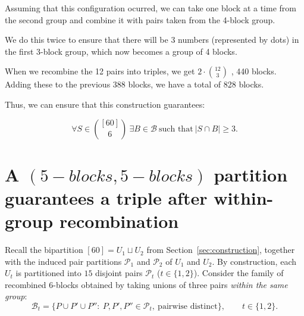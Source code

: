 \documentclass[11pt]{article}
\begin{document}

Assuming that this configuration ocurred, we can take one block at a time from the second group and combine it with pairs taken from the 4-block group.

We do this twice to ensure that there will be 3 numbers (represented by dots) in the first 3-block group, which now becomes a group of 4 blocks.

When we recombine the 12 pairs into triples, we get 
$2 \cdot \binom{12}{3}$ , 440 blocks. Adding these to the previous 388 blocks, we have a total of 828 blocks.

Thus, we can ensure that this construction guarantees:

\begin{equation}\label{eq:triple}
\forall S\in \binom{[60]}{6}\ \exists B\in\mathcal{B}\ \text{such that}\ |S\cap B|\ge 3.
\end{equation}

\section{A $(5-blocks,5-blocks)$ partition guarantees a triple after within-group recombination}
\label{sec:55-guarantee}

Recall the bipartition $[60]=U_1\sqcup U_2$ from Section~\ref{sec:construction}, together with the induced
pair partitions $\mathcal{P}_1$ and $\mathcal{P}_2$ of $U_1$ and $U_2$.
By construction, each $U_t$ is partitioned into $15$ disjoint pairs $\mathcal{P}_t$ ($t\in\{1,2\}$).
Consider the family of recombined $6$-blocks obtained by taking unions of three pairs \emph{within the same group}:
\[
\mathcal{B}_t=\{P\cup P'\cup P'':\ P,P',P''\in\mathcal{P}_t,\ \text{pairwise distinct}\},
\qquad t\in\{1,2\}.
\]
\end{document}
